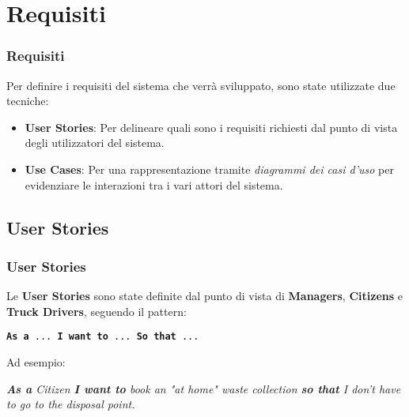 \section{Requisiti}
\frame{\tableofcontents[currentsection]}

\begin{frame}
    \frametitle{Requisiti}
    Per definire i requisiti del sistema che verrà sviluppato, sono state utilizzate due tecniche:

    \begin{itemize}
        \item \textbf{User Stories}: Per delineare quali sono i requisiti richiesti dal punto di vista degli utilizzatori
        del sistema.
        \item \textbf{Use Cases}: Per una rappresentazione tramite \textit{diagrammi dei casi d'uso} per evidenziare le
        interazioni tra i vari attori del sistema.
    \end{itemize}

\end{frame}

\subsection{User Stories}

\begin{frame}
    \frametitle{User Stories}
    Le \textbf{User Stories} sono state definite dal punto di vista di \textbf{Managers}, \textbf{Citizens} e
    \textbf{Truck Drivers}, seguendo il pattern:

    \bigskip

    \begin{block}{}
        \begin{center}
            \texttt{\textbf{As a} ... \textbf{I want to} ... \textbf{So that} ...}
        \end{center}
    \end{block}

    \bigskip

    Ad esempio:

    \medskip

    \begin{addmargin}[1em]{2em}
        \textit{\textbf{As a} Citizen \textbf{I want to} book an "at home" waste collection \textbf{so that} I don't have to go to the disposal point. }
    \end{addmargin}

\end{frame}

